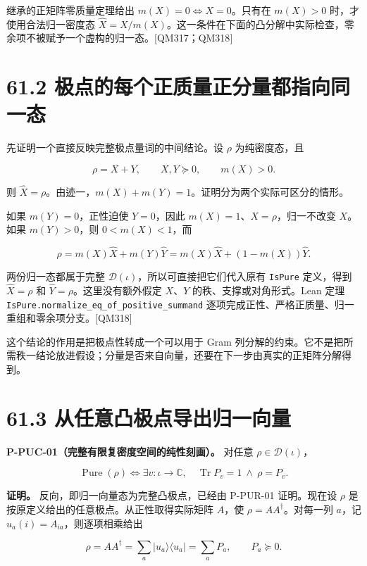\documentclass[
  11pt,
  oneside]{book}
\begin{document}
继承的正矩阵零质量定理给出 \(m(X)=0\iff X=0\)。只有在 \(m(X)>0\)
时，才使用合法归一密度态
\(\widehat X=X/m(X)\)。这一条件在下面的凸分解中实际检查，零余项不被赋予一个虚构的归一态。{[}QM317；QM318{]}

\section{61.2 极点的每个正质量正分量都指向同一态}

先证明一个直接反映完整极点量词的中间结论。设 \(\rho\) 为纯密度态，且

\[
\rho=X+Y,\qquad X,Y\succeq0,\qquad m(X)>0.
\]

则
\(\widehat X=\rho\)。由迹一，\(m(X)+m(Y)=1\)。证明分为两个实际可区分的情形。

如果 \(m(Y)=0\)，正性迫使 \(Y=0\)，因此
\(m(X)=1\)、\(X=\rho\)，归一不改变 \(X\)。如果 \(m(Y)>0\)，则
\(0<m(X)<1\)，而

\[
\rho=m(X)\widehat X+m(Y)\widehat Y
=m(X)\widehat X+(1-m(X))\widehat Y.
\]

两份归一态都属于完整 \(\mathcal D(\iota)\)，所以可直接把它们代入原有
\texttt{Is\allowbreak Pure} 定义，得到 \(\widehat X=\rho\) 和
\(\widehat Y=\rho\)。这里没有额外假定 \(X\)、\(Y\)
的秩、支撑或对角形式。Lean 定理
\texttt{Is\allowbreak Pure.\allowbreak normalize\_\allowbreak eq\_\allowbreak of\_\allowbreak positive\_\allowbreak summand}
逐项完成正性、严格正质量、归一重组和零余项分支。{[}QM318{]}

这个结论的作用是把极点性转成一个可以用于 Gram
列分解的约束。它不是把所需秩一结论放进假设；分量是否来自向量，还要在下一步由真实的正矩阵分解得到。

\section{61.3 从任意凸极点导出归一向量}

\protect\hypertarget{p-puc-01}{}{}

\textbf{P-PUC-01（完整有限复密度空间的纯性刻画）。} 对任意
\(\rho\in\mathcal D(\iota)\)，

\[
\operatorname{Pure}(\rho)
\iff
\exists v:\iota\to\mathbb C,\quad
\operatorname{Tr}P_v=1\ \land\ \rho=P_v.
\]

\textbf{证明。} 反向，即归一向量态为完整凸极点，已经由 P-PUR-01
证明。现在设 \(\rho\) 是按原定义给出的任意极点。从正性取得实际矩阵
\(A\)，使 \(\rho=AA^\dagger\)。对每一列 \(a\)，记
\(u_a(i)=A_{ia}\)，则逐项相乘给出

\[
\rho=AA^\dagger=\sum_a |u_a\rangle\langle u_a|
=\sum_a P_a,\qquad P_a\succeq0.
\]
\end{document}
